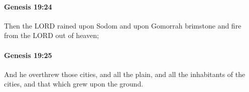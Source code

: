 		\paragraph{Genesis 19:24} %
			\label{GENESIS-19-24}

			Then the LORD rained upon Sodom and upon Gomorrah brimstone and fire from the LORD out of heaven;


		\paragraph{Genesis 19:25} %
			\label{GENESIS-19-25}

			And he overthrew those cities, and all the plain, and all the inhabitants of the cities, and that which grew upon the ground.



